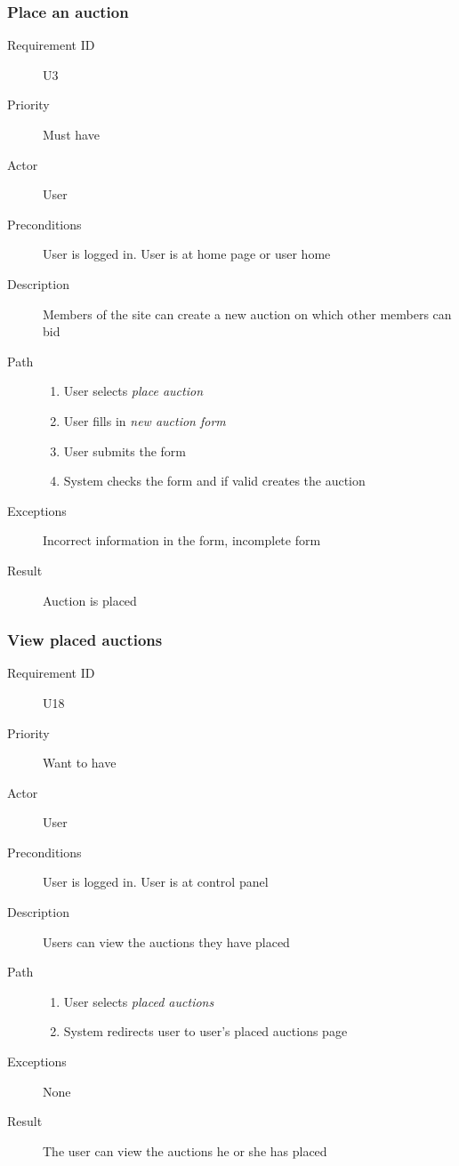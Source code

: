 		\subsubsection{Place an auction}
			\begin{description}
				\item[Requirement ID] U3
				\item[Priority] Must have
				\item[Actor] User
				\item[Preconditions] User is logged in. User is at home page or user home
				\item[Description] Members of the site can create a new auction on which
				other members can bid
				\item[Path]
 					\begin{enumerate}
						\item User selects \emph{place auction}
						\item User fills in \emph{new auction form}
						\item User submits the form
						\item System checks the form and if valid creates the auction
					\end{enumerate}
				\item[Exceptions] Incorrect information in the form, incomplete form
				\item[Result] Auction is placed
			\end{description}
		\subsubsection{View placed auctions}
			\begin{description}
				\item[Requirement ID] U18
				\item[Priority] Want to have
				\item[Actor] User
				\item[Preconditions] User is logged in. User is at control panel
				\item[Description] Users can view the auctions they have placed
				\item[Path]
 					\begin{enumerate}
						\item User selects \emph{placed auctions}
						\item System redirects user to user's placed auctions page
					\end{enumerate}
				\item[Exceptions] None
				\item[Result] The user can view the auctions he or she has placed
			\end{description}
